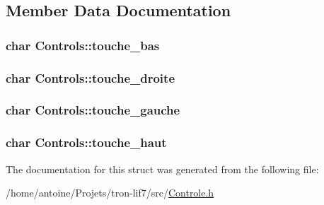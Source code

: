 \subsection{Member Data Documentation}
\hypertarget{structControls_a2e8bc4d7a0ff80fc9d34864cf392b03b}{
\subsubsection[{touche\-\_\-bas}]{\setlength{\rightskip}{0pt plus 5cm}char Controls\-::touche\-\_\-bas}}\label{structControls_a2e8bc4d7a0ff80fc9d34864cf392b03b}
\hypertarget{structControls_a43645d8ac58e05385bd29523704ef349}{
\subsubsection[{touche\-\_\-droite}]{\setlength{\rightskip}{0pt plus 5cm}char Controls\-::touche\-\_\-droite}}\label{structControls_a43645d8ac58e05385bd29523704ef349}
\hypertarget{structControls_a3fc1d06faef4cd94d6df592bc7e06c91}{
\subsubsection[{touche\-\_\-gauche}]{\setlength{\rightskip}{0pt plus 5cm}char Controls\-::touche\-\_\-gauche}}\label{structControls_a3fc1d06faef4cd94d6df592bc7e06c91}
\hypertarget{structControls_a0e730725c3756dd0f89c16c3e137199e}{
\subsubsection[{touche\-\_\-haut}]{\setlength{\rightskip}{0pt plus 5cm}char Controls\-::touche\-\_\-haut}}\label{structControls_a0e730725c3756dd0f89c16c3e137199e}


The documentation for this struct was generated from the following file\-:\begin{DoxyCompactItemize}
\item 
/home/antoine/\-Projets/tron-\/lif7/src/\hyperlink{Controle_8h}{Controle.\-h}\end{DoxyCompactItemize}
